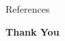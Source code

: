 \documentclass[aspectratio=169,xcolor=dvipsnames]{beamer}
\begin{document}
	
	
	
	

	
	\begin{frame}[allowframebreaks]{References}
		\tiny
		\nocite{*}
		\printbibliography[heading=none]
	\end{frame}
	
	
	\begin{frame}
		\Huge{\centerline{\textbf{Thank You}}}
	\end{frame}
	
\end{document}
